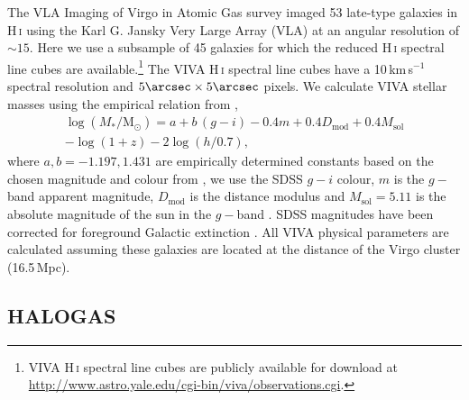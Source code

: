 \documentclass[fleqn,usenatbib]{mnras}
\begin{document}
The VLA Imaging of Virgo in Atomic Gas survey \citep[VIVA,][]{Chung2009} imaged 53 late-type galaxies in H\,\textsc{i} using the Karl G. Jansky Very Large Array (VLA) at an angular resolution of $\sim15$\arcsec. Here we use a subsample of 45 galaxies for which the reduced H\,\textsc{i} spectral line cubes are available.\footnote{VIVA H\,\textsc{i} spectral line cubes are publicly available for download at \url{http://www.astro.yale.edu/cgi-bin/viva/observations.cgi}.} The VIVA H\,\textsc{i} spectral line cubes have a 10\,km\,s$^{-1}$ spectral resolution and $5\arcsec\times5\arcsec$ pixels. We calculate VIVA stellar masses using the empirical relation from \cite{Taylor2011},
\begin{multline}
	\displaystyle \log(M_*/\mathrm{M}_{\odot}) = a + b\,(g-i) - 0.4m + 0.4D_{\mathrm{mod}} + 0.4M_{\mathrm{sol}} \\  - \log(1+z) - 2\log(h/0.7),
	\label{equ:mstar}
\end{multline}
where $a,b=-1.197,1.431$ are empirically determined constants based on the chosen magnitude and colour from \cite{Zibetti2009}, we use the SDSS $g-i$ colour, $m$ is the $g-$band apparent magnitude, $D_{\mathrm{mod}}$ is the distance modulus and $M_{\mathrm{sol}}=5.11$ is the absolute magnitude of the sun in the $g-$band \citep{Willmer2018}. SDSS magnitudes have been corrected for foreground Galactic extinction \citep{Kim2014}. All VIVA physical parameters are calculated assuming these galaxies are located at the distance of the Virgo cluster (16.5\,Mpc).

\subsection{HALOGAS}
\label{s-sec:halogas}
\end{document}
